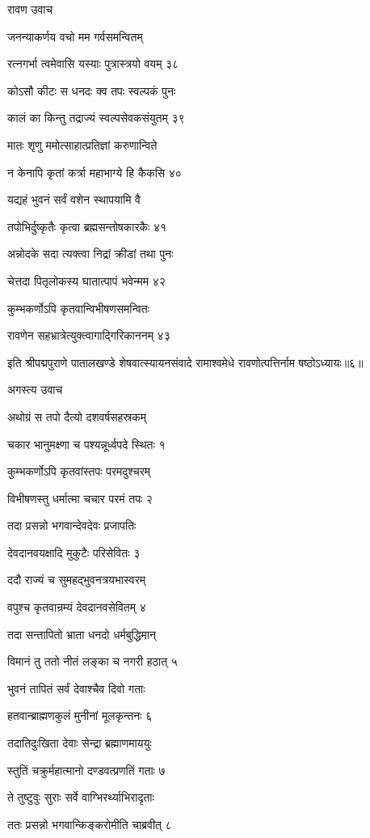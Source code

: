 रावण उवाच

जनन्याकर्णय वचो मम गर्वसमन्वितम्

रत्नगर्भा त्वमेवासि यस्याः पुत्रास्त्रयो वयम् ३८

कोऽसौ कीटः स धनदः क्व तपः स्वल्पकं पुनः

कालं का किन्तु तद्राज्यं स्वल्पसेवकसंयुतम् ३९

मातः शृणु ममोत्साहात्प्रतिज्ञां करुणान्विते

न केनापि कृतां कर्त्रा महाभाग्ये हि कैकसि ४०

यद्यहं भुवनं सर्वं वशेन स्थापयामि वै

तपोभिर्दुष्कृतैः कृत्वा ब्रह्मसन्तोषकारकैः ४१

अन्नोदके सदा त्यक्त्वा निद्रां क्रीडां तथा पुनः

चेत्तदा पितृलोकस्य घातात्पापं भवेन्मम ४२

कुम्भकर्णोऽपि कृतवान्विभीषणसमन्वितः

रावणेन सहभ्रात्रेत्युक्त्वागाद्गिरिकाननम् ४३

इति श्रीपद्मपुराणे पातालखण्डे शेषवात्स्यायनसंवादे रामाश्वमेधे रावणोत्पत्तिर्नाम षष्ठोऽध्यायः॥६॥


अगस्त्य उवाच

अथोग्रं स तपो दैत्यो दशवर्षसहस्रकम्

चकार भानुमक्ष्णा च पश्यन्नूर्ध्वपदे स्थितः १

कुम्भकर्णोऽपि कृतवांस्तपः परमदुश्चरम्

विभीषणस्तु धर्मात्मा चचार परमं तपः २

तदा प्रसन्नो भगवान्देवदेवः प्रजापतिः

देवदानवयक्षादि मुकुटैः परिसेवितः ३

ददौ राज्यं च सुमहद्भुवनत्रयभास्वरम्

वपुश्च कृतवान्रम्यं देवदानवसेवितम् ४

तदा सन्तापितो भ्राता धनदो धर्मबुद्धिमान्

विमानं तु ततो नीतं लङ्का च नगरी हठात् ५

भुवनं तापितं सर्वं देवाश्चैव दिवो गताः

हतवान्ब्राह्मणकुलं मुनीनां मूलकृन्तनः ६

तदातिदुःखिता देवाः सेन्द्रा ब्रह्माणमाययुः

स्तुतिं चक्रुर्महात्मानो दण्डवत्प्रणतिं गताः ७

ते तुष्टुवुः सुराः सर्वे वाग्भिरर्थ्याभिरादृताः

ततः प्रसन्नो भगवान्किङ्करोमीति चाब्रवीत् ८

